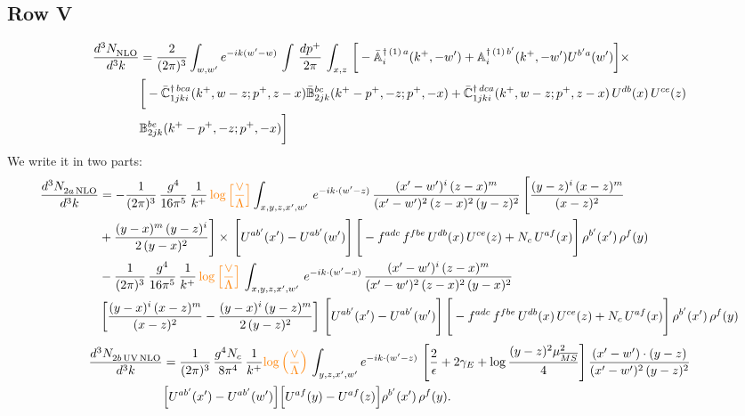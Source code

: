 \documentclass[9pt]{article}
\def\mf#1{\mathbb{#1}}
\numberwithin{equation}{section}
\begin{document}
\subsection{Row V}
\begin{align}
    \frac{d^{3}N_{\rm NLO}^{\rm}}{d^{3}k}  & = \frac{2}{(2\pi)^{3}}  \int_{w, w^\prime} e^{-ik(w^\prime-w)}\, \int\, \frac{dp^{+}}{2\pi}\,\int_{x,z}\, \bigg[-\bar{\mf{A}}^{\dagger\,(1)\,a}_{i}(k^{+},-w^{\prime})+\mf{A}^{\dagger\, (1)\, b^{\prime}}_{i}(k^{+},-w^{\prime})U^{b^{\prime}a}(w^{\prime})\bigg]\times\notag \\ & \bigg[-\Bar{\mf{C}}^{\dagger\, bca}_{1jki}(k^{+},w-z;p^{+},z-x)\Bar{\mf{B}}^{bc}_{2jk}(k^{+}-p^{+},- z;p^{+},-x)+\bar{\mf{C}}^{\dagger\, dca}_{1jki}(k^+,w-z; p^+, z-x)\,U^{db}(x)\,U^{ce}(z) \notag \\ & {\mf{B}}^{be}_{2jk} (k^{+}-p^+, -z; p^+, -x) \bigg]\nonumber
\end{align}
We write it in two parts: 
\begin{align}
    \frac{d^{3}N_{2a\,\rm NLO}^{\rm}}{d^{3}k}  & =   - \frac{1}{(2\pi)^{3}}\, \frac{g^{4}}{16\pi^{5}}\,\frac{1}{k^{+}}\,{\color{orange}\log{\left[\frac{\vee}{\Lambda}\right]}} \int_{x,y,z,x',w'}\, e^{-ik\cdot(w'-z)}\,\frac{(x'-w')^{i}\,(z-x)^{m}}{(x'-w')^{2}\,(z-x)^{2}\, (y-z)^{2}}\,\Bigg[\frac{(y-z)^{i}\,(x-z)^{m}}{(x-z)^{2}}\notag \\ & +\frac{(y-x)^{m}\,(y-z)^{i}}{2\,(y-x)^{2}}\Bigg]\times\, \Bigg[U^{ab'}(x')-U^{ab'}(w')\Bigg]\,\Bigg[-f^{adc}\,f^{fbe}\,U^{db}(x)\,U^{ce}(z)+N_{c}\,U^{af}(x)\Bigg]\,\rho^{b'}(x')\,\rho^{f}(y)\notag \\ & - \frac{1}{(2\pi)^{3}}\, \frac{g^{4}}{16\pi^{5}}\,\frac{1}{k^{+}}\,{\color{orange}\log{\left[\frac{\vee}{\Lambda}\right]}}\, \int_{x,y,z,x',w'}\,e^{-ik\cdot(w'-x)}\,\frac{(x'-w')^{i}\,(z-x)^{m}}{(x'-w')^{2}\,(z-x)^{2}\,(y-x)^{2}} \notag \\ &\left[\frac{(y-x)^{i}\,(x-z)^{m}}{(x-z)^{2}}-\frac{(y-x)^{i}\,(y-z)^{m}}{2\,(y-z)^{2}}\right]\, \Bigg[U^{ab'}(x')-U^{ab'}(w')\Bigg]\,\Bigg[-f^{adc}\,f^{fbe}\,U^{db}(x)\,U^{ce}(z)+N_{c}\,U^{af}(x)\Bigg]\,\rho^{b'}(x')\,\rho^{f}(y)
\end{align}
\begin{align}
\frac{d^{3}N_{2b\,\rm UV\, NLO}^{\rm}}{d^{3}k} & = \frac{1}{(2\pi)^{3}}\,\frac{g^{4}N_{c}}{8\pi^{4}}\,\frac{1}{k^{+}}
{\color{orange}\log\Big(\frac{\vee}{\Lambda}\Big)}\,\int_{y,z,x',w'}e^{-ik\cdot(w'-z)}\, \left[\frac{2}{\epsilon}+2\gamma_{E}+\log\frac{(y-z)^{2}\mu^{2}_{\overline{MS}}}{4}\right]
\frac{(x'-w')\cdot(y-z)}{(x'-w')^{2}\,(y-z)^{2}}\notag \\ &  \Big[U^{ab'}(x')-U^{ab'}(w')\Big]\Big[U^{af}(y)-U^{af}(z)\Big]\rho^{b'}(x')\,\rho^{f}(y).
\end{align}
\end{document}
